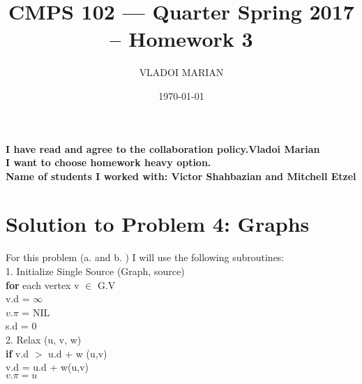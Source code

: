 \documentclass[11 pt]{article}
\title{ CMPS 102 --- Quarter  Spring 2017 --  Homework 3}
\author{VLADOI MARIAN}
\date{\today}
\begin{document}
\maketitle

\begin{center}
{\bf I have read and agree to the collaboration policy.Vladoi Marian}\\
{\bf I want to choose homework heavy option.}\\
{\bf Name of students I worked with: Victor Shahbazian and Mitchell Etzel }
\end{center}


\section*{Solution to Problem 4: Graphs}


For this problem (a. and b. ) I will use the following subroutines:\\
1. Initialize Single Source (Graph, source)\\
 \indent \textbf{for} each vertex v $\in $ G.V\\
 \indent \indent v.d = $\infty$\\
 \indent \indent $v.\pi$ = NIL\\
 \indent s.d = 0\\
 2. Relax (u, v, w)\\
 \indent \textbf{if} v.d $>$ u.d + w (u,v)\\
 \indent \indent v.d = u.d + w(u,v)\\
 \indent \indent $v.\pi = u $\\
 
\end{document}
